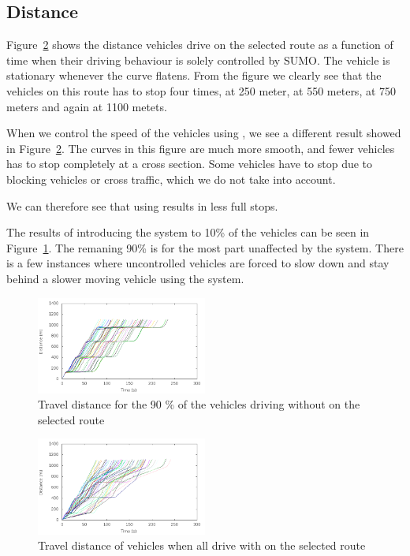\subsection{Distance}
Figure~\ref{fig:TestResults:distance100} shows the distance vehicles drive on the selected route as a function of time when their driving behaviour is solely controlled by SUMO. 
The vehicle is stationary whenever the curve flatens.
From the figure we clearly see that the vehicles on this route has to stop four times, at 250 meter, at 550 meters, at 750 meters and again at 1100 metets.

When we control the speed of the vehicles using \tech, we see a different result showed in Figure~\ref{fig:TestResults:distance100}.
The curves in this figure are much more smooth, and fewer vehicles has to stop completely at a cross section.
Some vehicles have to stop due to blocking vehicles or cross traffic, which we do not take into account.

We can therefore see that using \tech results in less full stops.

The results of introducing the system to 10\% of the vehicles can be seen in Figure~\ref{fig:TestResults:distanceUnC10}. 
The remaning 90\% is for the most part unaffected by the system. 
There is a few instances where uncontrolled vehicles are forced to slow down and stay behind a slower moving vehicle using the system.

\begin{figure}[H]
\includegraphics[width=0.5\textwidth]{images/tp0/distanceUncontrolled10.png}
\caption{Travel distance for the 90 \% of the vehicles driving without \tech on the selected route}
\label{fig:TestResults:distanceUnC10}
\end{figure}

\begin{figure}[H]
\includegraphics[width=0.5\textwidth]{images/tp0/distanceControlled100.png}
\caption{Travel distance of vehicles when all drive with \tech on the selected route}
\label{fig:TestResults:distance100}
\end{figure}

